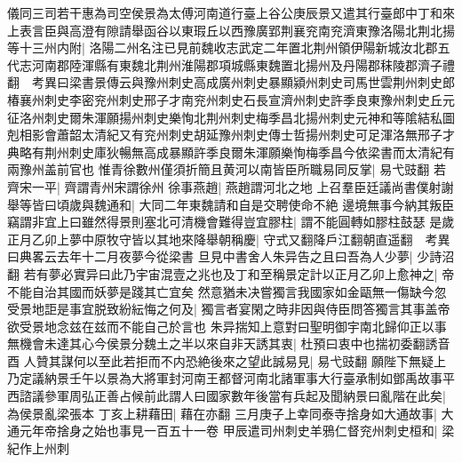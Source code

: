 儀同三司若干惠為司空侯景為太傅河南道行臺上谷公庚辰景又遣其行臺郎中丁和來上表言臣與高澄有隙請舉函谷以東瑕丘以西豫廣郢荆襄兖南兖濟東豫洛陽北荆北揚等十三州内附|{
	洛陽二州名注已見前魏收志武定二年置北荆州領伊陽新城汝北郡五代志河南郡陸渾縣有東魏北荆州淮陽郡項城縣東魏置北揚州及丹陽郡秣陵郡濟子禮翻　考異曰梁書景傳云與豫州刺史高成廣州刺史暴顯潁州刺史司馬世雲荆州刺史郎椿襄州刺史李密兖州刺史邢子才南兖州刺史石長宣濟州刺史許季良東豫州刺史丘元征洛州刺史爾朱渾願揚州刺史樂恂北荆州刺史梅季昌北揚州刺史元神和等隂結私圖剋相影會蕭韶太清紀又有兖州刺史胡延豫州刺史傳士哲揚州刺史可足渾洛無邢子才典略有荆州刺史庫狄暢無高成暴顯許季良爾朱渾願樂恂梅季昌今依梁書而太清紀有兩豫州盖前官也}
惟青徐數州僅須折簡且黄河以南皆臣所職易同反掌|{
	易弋豉翻}
若齊宋一平|{
	齊謂青州宋謂徐州}
徐事燕趙|{
	燕趙謂河北之地}
上召羣臣廷議尚書僕射謝舉等皆曰頃歲與魏通和|{
	大同二年東魏請和自是交聘使命不絶}
邊境無事今納其叛臣竊謂非宜上曰雖然得景則塞北可清機會難得豈宜膠柱|{
	謂不能圓轉如膠柱鼓瑟}
是歲正月乙卯上夢中原牧守皆以其地來降舉朝稱慶|{
	守式又翻降戶江翻朝直遥翻　考異曰典畧云去年十二月夜夢今從梁書}
旦見中書舍人朱异告之且曰吾為人少夢|{
	少詩沼翻}
若有夢必實异曰此乃宇宙混壹之兆也及丁和至稱景定計以正月乙卯上愈神之|{
	帝不能自治其國而妖夢是踐其亡宜矣}
然意猶未决嘗獨言我國家如金甌無一傷缺今忽受景地詎是事宜脱致紛紜悔之何及|{
	獨言者宴閑之時非因與侍臣問答獨言其事盖帝欲受景地念兹在兹而不能自己於言也}
朱异揣知上意對曰聖明御宇南北歸仰正以事無機會未達其心今侯景分魏土之半以來自非天誘其衷|{
	杜預曰衷中也揣初委翻誘音酉}
人贊其謀何以至此若拒而不内恐絶後來之望此誠易見|{
	易弋豉翻}
願陛下無疑上乃定議納景壬午以景為大將軍封河南王都督河南北諸軍事大行臺承制如鄧禹故事平西諮議參軍周弘正善占候前此謂人曰國家數年後當有兵起及聞納景曰亂階在此矣|{
	為侯景亂梁張本}
丁亥上耕藉田|{
	藉在亦翻}
三月庚子上幸同泰寺捨身如大通故事|{
	大通元年帝捨身之始也事見一百五十一卷}
甲辰遣司州刺史羊鴉仁督兖州刺史桓和|{
	梁紀作上州刺}


